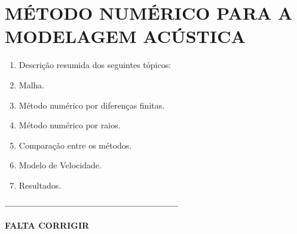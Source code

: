 \chapter{M\'{E}TODO NUM\'{E}RICO PARA A MODELAGEM ACÚSTICA}
\label{cap4}

\begin{enumerate}
      \item Descrição resumida dos seguintes tópicos:
      \item Malha.
      \item Método numérico por diferenças finitas.
      \item Método numérico por raios.
      \item Comparação entre os métodos.
      \item Modelo de Velocidade.
      \item Resultados.
\end{enumerate}

\textbf{------------------------------------------------------}

\textbf{FALTA CORRIGIR}

